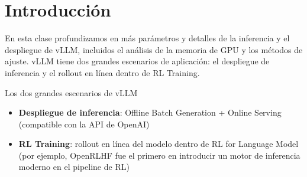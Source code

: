 \section{Introducción}
En esta clase profundizamos en más parámetros y detalles de la inferencia y el despliegue de vLLM, incluidos el análisis de la memoria de GPU y los métodos de ajuste. vLLM tiene dos grandes escenarios de aplicación: el despliegue de inferencia y el rollout en línea dentro de RL Training.

\begin{importantbox}{Los dos grandes escenarios de vLLM}
\begin{itemize}
  \item \textbf{Despliegue de inferencia}: Offline Batch Generation + Online Serving (compatible con la API de OpenAI)
  \item \textbf{RL Training}: rollout en línea del modelo dentro de RL for Language Model (por ejemplo, OpenRLHF fue el primero en introducir un motor de inferencia moderno en el pipeline de RL)
\end{itemize}
\end{importantbox}

